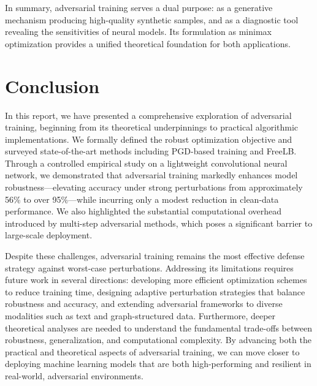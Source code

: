 \documentclass[10pt,twocolumn,letterpaper]{article}
\begin{document}
\medskip
In summary, adversarial training serves a dual purpose: as a generative mechanism producing high-quality synthetic samples, and as a diagnostic tool revealing the sensitivities of neural models. Its formulation as minimax optimization provides a unified theoretical foundation for both applications.

\section{Conclusion}

In this report, we have presented a comprehensive exploration of adversarial training, beginning from its theoretical underpinnings to practical algorithmic implementations. We formally defined the robust optimization objective and surveyed state-of-the-art methods including PGD-based training and FreeLB. Through a controlled empirical study on a lightweight convolutional neural network, we demonstrated that adversarial training markedly enhances model robustness—elevating accuracy under strong perturbations from approximately 56\% to over 95\%—while incurring only a modest reduction in clean-data performance. We also highlighted the substantial computational overhead introduced by multi-step adversarial methods, which poses a significant barrier to large-scale deployment.

Despite these challenges, adversarial training remains the most effective defense strategy against worst-case perturbations. Addressing its limitations requires future work in several directions: developing more efficient optimization schemes to reduce training time, designing adaptive perturbation strategies that balance robustness and accuracy, and extending adversarial frameworks to diverse modalities such as text and graph-structured data. Furthermore, deeper theoretical analyses are needed to understand the fundamental trade-offs between robustness, generalization, and computational complexity. By advancing both the practical and theoretical aspects of adversarial training, we can move closer to deploying machine learning models that are both high-performing and resilient in real-world, adversarial environments.

{\small


}
\end{document}
